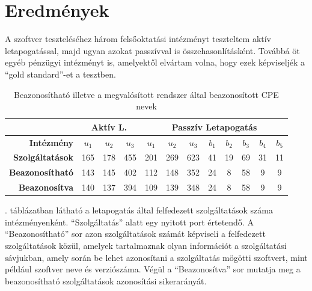 \section*{Eredmények}

	A szoftver teszteléséhez három felsőoktatási intézményt teszteltem aktív letapogatással, majd ugyan azokat passzívval is összehasonlításként. Továbbá öt egyéb pénzügyi intézményt is, amelyektől elvártam volna, hogy ezek képviseljék a ``gold standard''-et a tesztben.

	\begin{table}[H]
		\centering
		\begin{tabular}{r|ccc|ccc|ccccc|}
			\cline{2-12}
			\multicolumn{1}{l|}{}                         & \multicolumn{3}{c|}{\textbf{Aktív L.}} & \multicolumn{8}{c|}{\textbf{Passzív Letapogatás}}                                                             \\ \hline
			\multicolumn{1}{|r|}{\textbf{Intézmény}}      & \textbf{$u_1$}    & \textbf{$u_2$}    & \textbf{$u_3$}   & \textbf{$u_1$} & \textbf{$u_2$} & \textbf{$u_3$} & \textbf{$b_1$} & \textbf{$b_2$} & \textbf{$b_3$} & \textbf{$b_4$} & \textbf{$b_5$} \\ \hline
			\multicolumn{1}{|r|}{\textbf{Szolgáltatások}} & 165            & 178            & 455           & 201         & 269         & 623         & 41          & 19          & 69          & 31          & 11          \\
			\multicolumn{1}{|r|}{\textbf{Beazonosítható}} & 143            & 145            & 402           & 112         & 148         & 352         & 24          & 8           & 58          & 9           & 9           \\
			\multicolumn{1}{|r|}{\textbf{Beazonosítva}}   & 140            & 137            & 394           & 109         & 139         & 348         & 24          & 8           & 58          & 9           & 9           \\ \hline
		\end{tabular}
		\caption{Beazonosítható illetve a megvalósított rendszer által beazonosított CPE nevek}
		\label{cpeids}
	\end{table}
	
	\Az{\ref{cpeids}}. táblázatban látható a letapogatás által felfedezett szolgáltatások száma intézményenként. ``Szolgáltatás'' alatt egy nyitott port értetendő. A ``Beazonosítható'' sor azon szolgáltatások számát képviseli a felfedezett szolgáltatások közül, amelyek tartalmaznak olyan információt a szolgáltatási sávjukban, amely során be lehet azonosítani a szolgáltatás mögötti szoftvert, mint például szoftver neve és verziószáma. Végül a ``Beazonosítva'' sor mutatja meg a beazonosítható szolgáltatások azonosítási sikerarányát.
	
